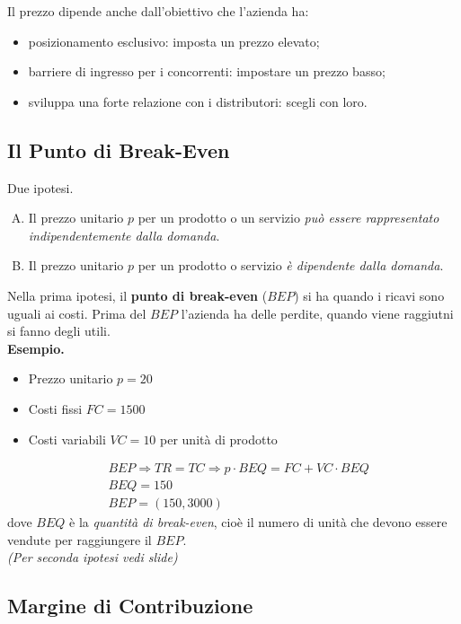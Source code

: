 \documentclass[a4paper,portrait,12pt]{article}
\theoremstyle{definition}
\begin{document}
Il prezzo dipende anche dall'obiettivo che l'azienda ha:
\begin{itemize}
\item posizionamento esclusivo: imposta un prezzo elevato;
\item barriere di ingresso per i concorrenti: impostare un prezzo basso;
\item sviluppa una forte relazione con i distributori: scegli con loro.
\end{itemize}

\subsection{Il Punto di Break-Even}
Due ipotesi.
\begin{enumerate}[A.]
\item Il prezzo unitario $p$ per un prodotto o un servizio \emph{può essere rappresentato indipendentemente dalla domanda}.
\item Il prezzo unitario $p$ per un prodotto o servizio \emph{è dipendente dalla domanda}.
\end{enumerate}

Nella prima ipotesi, il \textbf{punto di break-even} ($BEP$) si ha quando i ricavi sono uguali ai costi.
Prima del $BEP$ l'azienda ha delle perdite, quando viene raggiutni si fanno degli utili.\\

\textbf{Esempio.}
\begin{itemize}
\item Prezzo unitario $p = 20$
\item Costi fissi $FC = 1500$
\item Costi variabili $VC = 10$ per unità di prodotto 
\end{itemize}

\begin{align*}
&BEP \Rightarrow TR = TC \Rightarrow p \cdot BEQ = FC + VC \cdot BEQ\\
&BEQ = 150\\
&BEP = (150, 3000)
\end{align*}
dove $BEQ$ è la \emph{quantità di break-even}, cioè il numero di unità che devono essere vendute per raggiungere il $BEP$.\\

\emph{(Per seconda ipotesi vedi slide)}

\subsection{Margine di Contribuzione}
\end{document}
